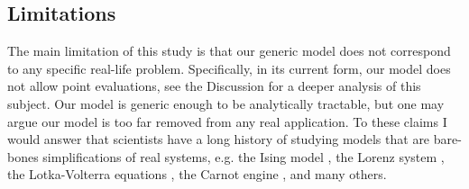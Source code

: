 \subsection{Limitations}\label{subsec:limitations}
The main limitation of this study is that our generic model does not
correspond to any specific real-life problem. Specifically, in its
current form, our model does not allow point evaluations, see the
Discussion for a deeper analysis of this subject. Our model is generic
enough to be analytically tractable, but one may argue our model is
too far removed from any real application. To these claims I would
answer that scientists have a long history of studying models that are
bare-bones simplifications of real systems, e.g. the Ising model
\cite{cipra1987}, the Lorenz system \cite{brin}, the Lotka-Volterra
equations \cite{logan2006}, the Carnot engine \cite{kardar2007}, and
many others.
